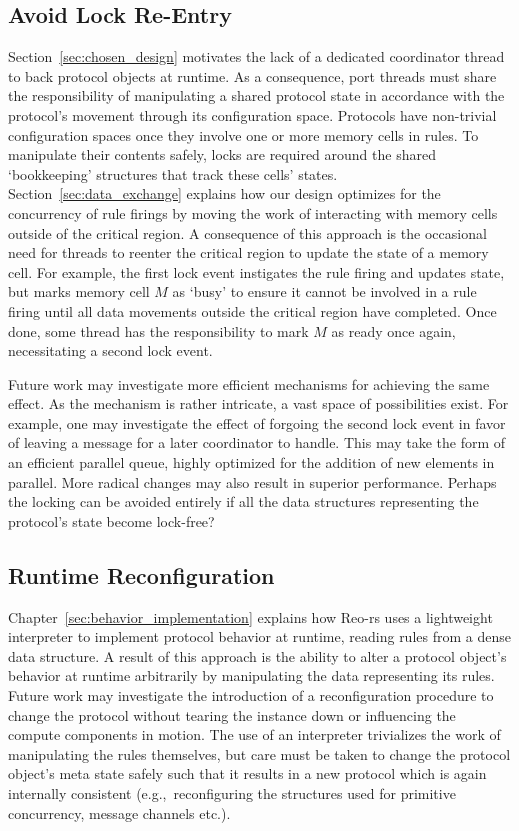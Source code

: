 \subsection{Avoid Lock Re-Entry}
Section~\ref{sec:chosen_design} motivates the lack of a dedicated coordinator thread to back protocol objects at runtime. As a consequence, port threads must share the responsibility of manipulating a shared protocol state in accordance with the protocol's movement through its configuration space. Protocols have non-trivial configuration spaces once they involve one or more memory cells in rules. To manipulate their contents safely, locks are required around the shared `bookkeeping' structures that track these cells' states. Section~\ref{sec:data_exchange} explains how our design optimizes for the concurrency of rule firings by moving the work of interacting with memory cells outside of the critical region. A consequence of this approach is the occasional need for threads to reenter the critical region to update the state of a memory cell. For example, the first lock event instigates the rule firing and updates state, but marks memory cell $M$ as `busy' to ensure it cannot be involved in a rule firing until all data movements outside the critical region have completed. Once done, some thread has the responsibility to mark $M$ as ready once again, necessitating a second lock event.

Future work may investigate more efficient mechanisms for achieving the same effect. As the mechanism is rather intricate, a vast space of possibilities exist. For example, one may investigate the effect of forgoing the second lock event in favor of leaving a message for a later coordinator to handle. This may take the form of an efficient parallel queue, highly optimized for the addition of new elements in parallel. More radical changes may also result in superior performance. Perhaps the locking can be avoided entirely if all the data structures representing the protocol's state become lock-free?

\subsection{Runtime Reconfiguration}
\label{sec:future_runtime_reconfig}
Chapter~\ref{sec:behavior_implementation} explains how Reo-rs uses a lightweight interpreter to implement protocol behavior at runtime, reading rules from a dense data structure. A result of this approach is the ability to alter a protocol object's behavior at runtime arbitrarily by manipulating the data representing its rules. Future work may investigate the introduction of a reconfiguration procedure to change the protocol without tearing the instance down or influencing the compute components in motion. The use of an interpreter trivializes the work of manipulating the rules themselves, but care must be taken to change the protocol object's meta state safely such that it results in a new protocol which is again internally consistent (e.g.,\ reconfiguring the structures used for primitive concurrency, message channels etc.).

